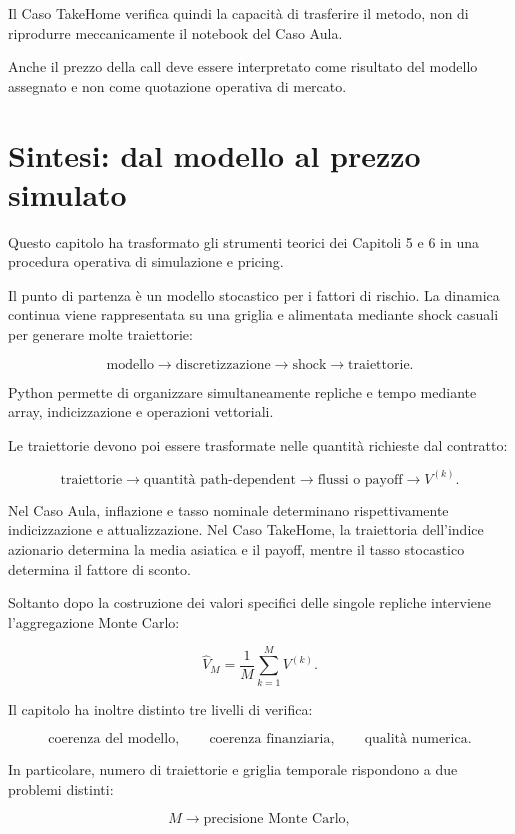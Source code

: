 Il Caso TakeHome verifica quindi la capacit\`a di trasferire il metodo, non di
riprodurre meccanicamente il notebook del Caso Aula.

Anche il prezzo della call deve essere interpretato come risultato del modello
assegnato e non come quotazione operativa di mercato.


\section{Sintesi: dal modello al prezzo simulato}

Questo capitolo ha trasformato gli strumenti teorici dei Capitoli 5 e 6 in una
procedura operativa di simulazione e pricing.

Il punto di partenza \`e un modello stocastico per i fattori di rischio. La
dinamica continua viene rappresentata su una griglia e alimentata mediante
shock casuali per generare molte traiettorie:

\[
\text{modello}
\longrightarrow
\text{discretizzazione}
\longrightarrow
\text{shock}
\longrightarrow
\text{traiettorie}.
\]

Python permette di organizzare simultaneamente repliche e tempo mediante array,
indicizzazione e operazioni vettoriali.

Le traiettorie devono poi essere trasformate nelle quantit\`a richieste dal
contratto:

\[
\text{traiettorie}
\longrightarrow
\text{quantit\`a path-dependent}
\longrightarrow
\text{flussi o payoff}
\longrightarrow
V^{(k)}.
\]

Nel Caso Aula, inflazione e tasso nominale determinano rispettivamente
indicizzazione e attualizzazione. Nel Caso TakeHome, la traiettoria
dell'indice azionario determina la media asiatica e il payoff, mentre il tasso
stocastico determina il fattore di sconto.

Soltanto dopo la costruzione dei valori specifici delle singole repliche interviene
l'aggregazione Monte Carlo:

\[
\widehat V_M
=
\frac{1}{M}
\sum_{k=1}^{M}
V^{(k)}.
\]

Il capitolo ha inoltre distinto tre livelli di verifica:

\[
\text{coerenza del modello},
\qquad
\text{coerenza finanziaria},
\qquad
\text{qualit\`a numerica}.
\]

In particolare, numero di traiettorie e griglia temporale rispondono a due
problemi distinti:

\[
M
\longrightarrow
\text{precisione Monte Carlo},
\]


